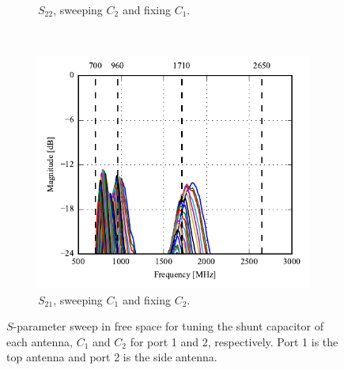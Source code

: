 \begin{figure}[htbp]
\begin{subfigure}[b]{0.49\linewidth}
        \caption{$S_{22}$, sweeping $C_2$ and fixing $C_1$.}
    \end{subfigure}
~
\center
    \begin{subfigure}[b]{0.49\linewidth}
        \centering
        \includegraphics{img/tech_sol/monopole/5mm/meas/S21.pdf}
        \caption{$S_{21}$, sweeping $C_1$ and fixing $C_2$.}
    \end{subfigure}
    \caption{$S$-parameter sweep in free space for tuning the shunt capacitor of each antenna, $C_1$ and $C_2$ for port 1 and 2, respectively. Port 1 is the top antenna and port 2 is the side antenna.}
    \label{fig:sparam_mono_mini_meas}
\end{figure}

